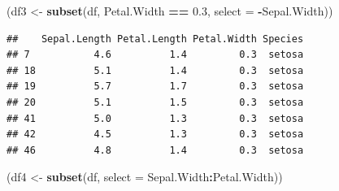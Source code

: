 \documentclass[
]{book}
\newenvironment{Shaded}{\begin{snugshade}}{\end{snugshade}}
\newcommand{\AttributeTok}[1]{\textcolor[rgb]{0.13,0.29,0.53}{#1}}
\newcommand{\FloatTok}[1]{\textcolor[rgb]{0.00,0.00,0.81}{#1}}
\newcommand{\FunctionTok}[1]{\textcolor[rgb]{0.13,0.29,0.53}{\textbf{#1}}}
\newcommand{\NormalTok}[1]{#1}
\newcommand{\OtherTok}[1]{\textcolor[rgb]{0.56,0.35,0.01}{#1}}
\newcommand{\SpecialCharTok}[1]{\textcolor[rgb]{0.81,0.36,0.00}{\textbf{#1}}}
\theoremstyle{definition}
\theoremstyle{definition}
\theoremstyle{definition}
\theoremstyle{definition}
\theoremstyle{remark}
\begin{document}
\begin{Shaded}
\begin{Highlighting}[]
\NormalTok{(df3 }\OtherTok{\textless{}{-}} \FunctionTok{subset}\NormalTok{(df, Petal.Width }\SpecialCharTok{==} \FloatTok{0.3}\NormalTok{, }\AttributeTok{select =} \SpecialCharTok{{-}}\NormalTok{Sepal.Width))}
\end{Highlighting}
\end{Shaded}

\begin{verbatim}
##    Sepal.Length Petal.Length Petal.Width Species
## 7           4.6          1.4         0.3  setosa
## 18          5.1          1.4         0.3  setosa
## 19          5.7          1.7         0.3  setosa
## 20          5.1          1.5         0.3  setosa
## 41          5.0          1.3         0.3  setosa
## 42          4.5          1.3         0.3  setosa
## 46          4.8          1.4         0.3  setosa
\end{verbatim}

\begin{Shaded}
\begin{Highlighting}[]
\NormalTok{(df4 }\OtherTok{\textless{}{-}} \FunctionTok{subset}\NormalTok{(df, }\AttributeTok{select =}\NormalTok{ Sepal.Width}\SpecialCharTok{:}\NormalTok{Petal.Width))}
\end{Highlighting}
\end{Shaded}
\end{document}
